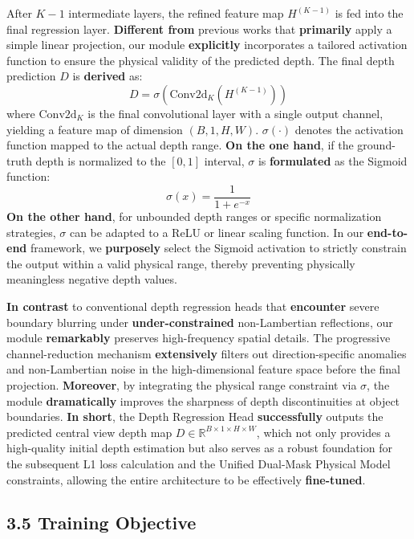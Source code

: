 \documentclass[journal]{IEEEtran}
\begin{document}
After $K-1$ intermediate layers, the refined feature map $H^{(K-1)}$ is fed into the final regression layer. \textbf{Different from} previous works that \textbf{primarily} apply a simple linear projection, our module \textbf{explicitly} incorporates a tailored activation function to ensure the physical validity of the predicted depth. The final depth prediction $D$ is \textbf{derived} as:
\[
\begin{equation}
D = \sigma(\text{Conv2d}_{K}(H^{(K-1)}))
\end{equation}
\]
where $\text{Conv2d}_{K}$ is the final convolutional layer with a single output channel, yielding a feature map of dimension $(B, 1, H, W)$. $\sigma(\cdot)$ denotes the activation function mapped to the actual depth range. \textbf{On the one hand}, if the ground-truth depth is normalized to the $[0, 1]$ interval, $\sigma$ is \textbf{formulated} as the Sigmoid function:
\[
\begin{equation}
\sigma(x) = \frac{1}{1 + e^{-x}}
\end{equation}
\]
\textbf{On the other hand}, for unbounded depth ranges or specific normalization strategies, $\sigma$ can be adapted to a ReLU or linear scaling function. In our \textbf{end-to-end} framework, we \textbf{purposely} select the Sigmoid activation to strictly constrain the output within a valid physical range, thereby preventing physically meaningless negative depth values.

\textbf{In contrast} to conventional depth regression heads that \textbf{encounter} severe boundary blurring under \textbf{under-constrained} non-Lambertian reflections, our module \textbf{remarkably} preserves high-frequency spatial details. The progressive channel-reduction mechanism \textbf{extensively} filters out direction-specific anomalies and non-Lambertian noise in the high-dimensional feature space before the final projection. \textbf{Moreover}, by integrating the physical range constraint via $\sigma$, the module \textbf{dramatically} improves the sharpness of depth discontinuities at object boundaries. \textbf{In short}, the Depth Regression Head \textbf{successfully} outputs the predicted central view depth map $D \in \mathbb{R}^{B \times 1 \times H \times W}$, which not only provides a high-quality initial depth estimation but also serves as a robust foundation for the subsequent L1 loss calculation and the Unified Dual-Mask Physical Model constraints, allowing the entire architecture to be effectively \textbf{fine-tuned}.

\subsection{3.5 Training Objective}
\end{document}
